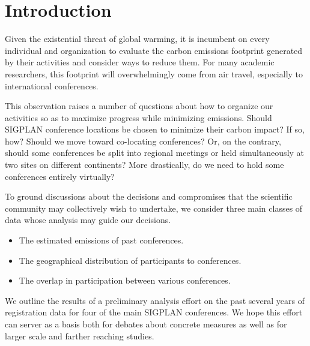 
\section{Introduction}

Given the existential threat of global warming, it is incumbent on every
individual and organization to evaluate the carbon emissions footprint
generated by their activities and consider ways to reduce them.  For many
academic researchers, this footprint will overwhelmingly come from air
travel, especially to international conferences.

This observation raises a number of questions about how to organize our
activities so as to maximize progress while minimizing emissions.  Should
SIGPLAN conference locations be chosen to minimize their carbon impact? If
so, how? Should we move toward co-locating conferences? Or, on the contrary,
should some conferences be split into regional meetings or held
simultaneously at two sites on different continents?  More drastically,
do we need to hold some conferences entirely virtually?

To ground discussions about the decisions and compromises that the
scientific community may collectively wish to undertake, we consider three
main classes of data whose analysis may guide our decisions.
\begin{itemize}
\item The estimated emissions of past conferences.
\item The geographical distribution of participants to conferences.
\item The overlap in participation between various conferences.
\end{itemize}

We outline the results of a preliminary analysis effort on the past several
years of registration data for four of the main SIGPLAN conferences.  We
hope this effort can server as a basis both for debates about concrete
measures as well as for larger scale and farther reaching studies.  

